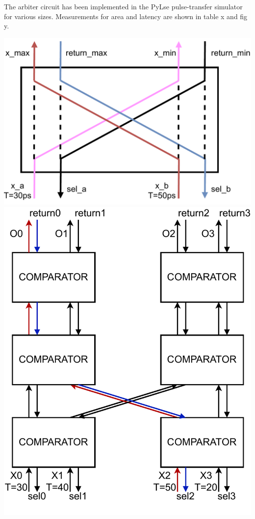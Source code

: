 \documentclass{article}
\begin{document}
The arbiter circuit has been implemented in the PyLse
pulse-transfer simulator for various sizes. Measurements for
area and latency are shown in table x and fig y.

\includegraphics*[width=0.25\paperwidth]{diagrams/comparator.drawio.pdf}
\includegraphics*[width=0.25\paperwidth]{diagrams/sort4.drawio.pdf}
\end{document}
